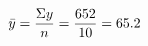 \documentclass[preview]{standalone}
\begin{document}
\begin{align*}
\special{dvisvgm:raw <g id='unique000'>}\bar{y} = \frac{\Sigma y}{n} = \frac{652}{10} = 65.2\special{dvisvgm:raw </g>}
\end{align*}
\end{document}
